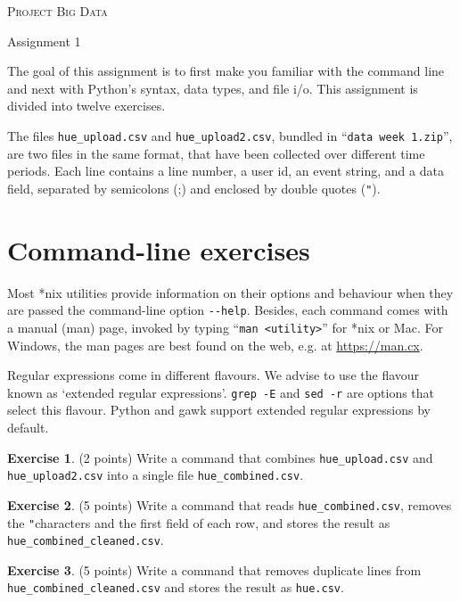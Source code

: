 \documentclass[a4paper]{report}
\theoremstyle{definition}
\newtheorem{exercise}{Exercise}
\newcommand{\blankline}{\par\vspace{5mm}}
\newcommand{\doublequote}{\texttt{"}}
\begin{document}
	
	\begin{center}
		\textsc{\Large Project Big Data}
		\blankline
		
		{\large Assignment 1}
	\end{center}
	
	\blankline \noindent The goal of this assignment is to first make you familiar with the command line and next with Python’s syntax, data types, and file i/o. This assignment is divided into twelve exercises.
	
	The files \texttt{hue\_upload.csv} and \texttt{hue\_upload2.csv}, bundled in ``\texttt{data week 1.zip}'',
	are two files in the same format, that have been collected over different time periods. Each line contains a line number, a user id, an event string, and a data field, separated by semicolons (;) and enclosed by double quotes (\doublequote{}).
	
	\section*{Command-line exercises}
	\label{command-line-exercises}
	
	Most *nix utilities provide information on their options and behaviour when
	they are passed the command-line option \texttt{-{}-help}. Besides, each
	command comes with a manual (man) page, invoked by typing ``\texttt{man
		<utility>}'' for
	*nix or Mac. For Windows, the man pages are best found on the web, e.g.
	at \url{https://man.cx}.
	
	Regular expressions come in different flavours. We advise to use the flavour
	known as `extended regular expressions'. \texttt{grep -E} and \texttt{sed -r}
	are options that select this flavour. Python and gawk support extended regular
	expressions by default.
	
	\begin{exercise}
		(2 points) Write a command that combines \texttt{hue\_upload.csv} and \texttt{hue\_upload2.csv} into a single file \texttt{hue\_combined.csv}.
	\end{exercise}
	
	\begin{exercise}
		(5 points) Write a command that reads \texttt{hue\_combined.csv}, removes the \doublequote characters and the first field of each row, and stores the result as \texttt{hue\_combined\_cleaned.csv}.
	\end{exercise}
	
	\begin{exercise}
		(5 points) Write a command that removes duplicate lines from \texttt{hue\_combined\_cleaned.csv} and stores the result as \texttt{hue.csv}.
	\end{exercise}
	
\end{document}
